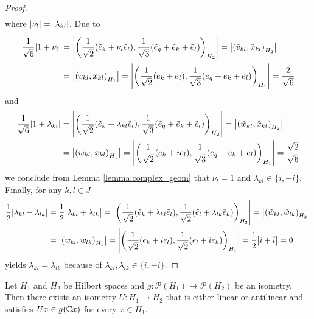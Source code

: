 \begin{proof}
\begin{align*}
	\end{align*}
	where ${\left | \nu_l \right |} = {\left | \lambda_{kl} \right |}$. Due to 
	\begin{align*}
		\frac{1}{\sqrt{6}}{\left | 1 + \nu_l \right |} &= {\left | {\left ( \frac{1}{\sqrt{2}}(\tilde{e}_k + \nu_l \tilde{e}_l), \frac{1}{\sqrt{3}}(\tilde{e}_q + \tilde{e}_k + \tilde{e}_l) \right )}_{H_2} \right |} = {\left | {\left ( \tilde{v}_{kl}, \tilde{x}_{kl} \right )}_{H_2} \right |} \\
		&= {\left | {\left ( v_{kl}, x_{kl} \right )}_{H_1} \right |} = {\left | {\left ( \frac{1}{\sqrt{2}}(e_k + e_l), \frac{1}{\sqrt{3}}(e_q + e_k + e_l) \right )}_{H_1} \right |} = \frac{2}{\sqrt{6}}
	\end{align*}
	and 
	\begin{align*}
		\frac{1}{\sqrt{6}}{\left | 1 + \lambda_{kl} \right |} &= {\left | {\left ( \frac{1}{\sqrt{2}}(\tilde{e}_k + \lambda_{kl} \tilde{e}_l), \frac{1}{\sqrt{3}}(\tilde{e}_q + \tilde{e}_k + \tilde{e}_l) \right )}_{H_2} \right |} = {\left | {\left ( \tilde{w}_{kl}, \tilde{x}_{kl} \right )}_{H_2} \right |} \\
		&= {\left | {\left ( w_{kl}, x_{kl} \right )}_{H_1} \right |} = {\left | {\left ( \frac{1}{\sqrt{2}}(e_k + i e_l), \frac{1}{\sqrt{3}}(e_q + e_k + e_l) \right )}_{H_1} \right |} = \frac{\sqrt{2}}{\sqrt{6}}
	\end{align*}
	we conclude from Lemma \ref{lemma:complex_geom} that $\nu_l = 1$ and $\lambda_{kl} \in \{i, -i\}$. Finally, for any $k,l \in J$
	\begin{align*}
		\frac{1}{2}{\left | \lambda_{kl} - \lambda_{lk} \right |} &= \frac{1}{2}{\left | \lambda_{kl} + \overline{\lambda_{lk}} \right |} = {\left | {\left ( \frac{1}{\sqrt{2}}(\tilde{e}_k + \lambda_{kl} \tilde{e}_l), \frac{1}{\sqrt{2}}(\tilde{e}_l + \lambda_{lk} \tilde{e}_k) \right )}_{H_2} \right |} = {\left | {\left ( \tilde{w}_{kl}, \tilde{w}_{lk} \right )}_{H_2} \right |} \\
		&= {\left | {\left ( w_{kl}, w_{lk} \right )}_{H_1} \right |} = {\left | {\left ( \frac{1}{\sqrt{2}}(e_k + i e_l), \frac{1}{\sqrt{2}}(e_l + i e_k) \right )}_{H_1} \right |} = \frac{1}{2} {\left | i + \overline{i} \right |} = 0
	\end{align*}
	yields $\lambda_{kl} = \lambda_{lk}$ because of $\lambda_{kl}, \lambda_{lk} \in \{i, -i\}$. 
\end{proof}


\begin{theorem}[Wigner] \label{theorem:wigner}
	Let $H_1$ and $H_2$ be Hilbert spaces and $g: \mathcal{P}(H_1) \to \mathcal{P}(H_2)$ be an isometry. Then there exists an isometry $U: H_1 \to H_2$ that is either linear or antilinear and satisfies $Ux \in g(\mathbb{C} x)$ for every $x \in H_1$. 
\end{theorem}

